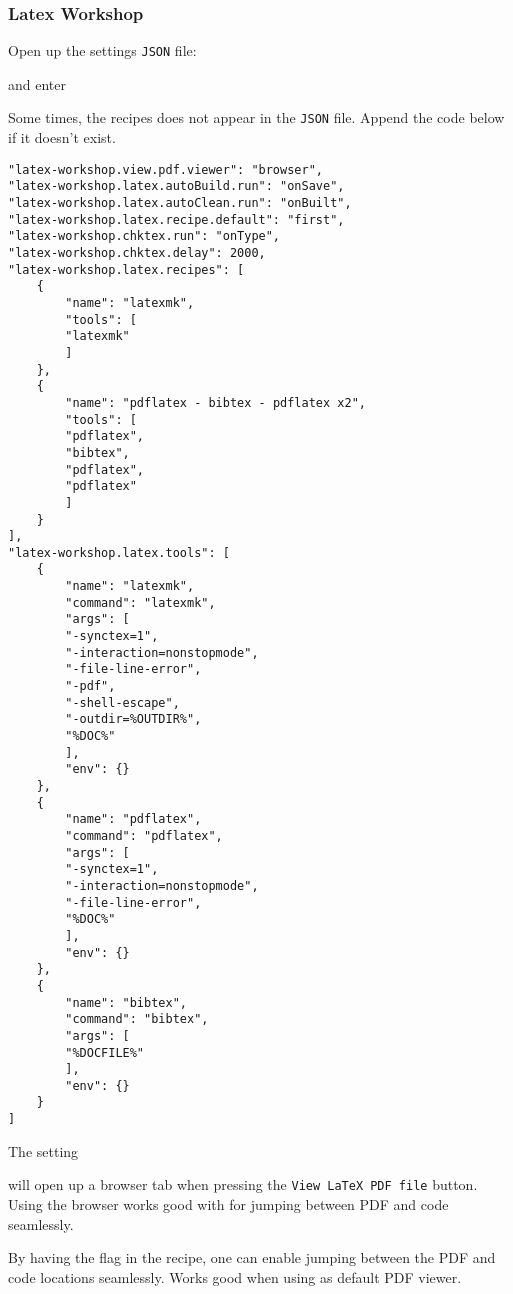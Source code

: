 \subsubsection{Latex Workshop}

Open up the settings \texttt{JSON} file:

 and enter


Some times, the recipes does not appear in the \texttt{JSON} file. Append the code below if it doesn't exist. 

\begin{verbatim}
"latex-workshop.view.pdf.viewer": "browser",
"latex-workshop.latex.autoBuild.run": "onSave",
"latex-workshop.latex.autoClean.run": "onBuilt",
"latex-workshop.latex.recipe.default": "first",
"latex-workshop.chktex.run": "onType",
"latex-workshop.chktex.delay": 2000,
"latex-workshop.latex.recipes": [
    {
        "name": "latexmk",
        "tools": [
        "latexmk"
        ]
    },
    {
        "name": "pdflatex - bibtex - pdflatex x2",
        "tools": [
        "pdflatex",
        "bibtex",
        "pdflatex",
        "pdflatex"
        ]
    }
],
"latex-workshop.latex.tools": [
    {
        "name": "latexmk",
        "command": "latexmk",
        "args": [
        "-synctex=1",
        "-interaction=nonstopmode",
        "-file-line-error",
        "-pdf",
        "-shell-escape",
        "-outdir=%OUTDIR%",
        "%DOC%"
        ],
        "env": {}
    },
    {
        "name": "pdflatex",
        "command": "pdflatex",
        "args": [
        "-synctex=1",
        "-interaction=nonstopmode",
        "-file-line-error",
        "%DOC%"
        ],
        "env": {}
    },
    {
        "name": "bibtex",
        "command": "bibtex",
        "args": [
        "%DOCFILE%"
        ],
        "env": {}
    }
]
\end{verbatim}


The setting


will open up a browser tab when pressing the \texttt{View LaTeX PDF file} button. Using the browser works good with  for jumping between PDF and code seamlessly.


By having the flag  in the recipe, one can enable jumping between the PDF and code locations seamlessly. Works good when using  as default PDF viewer.

